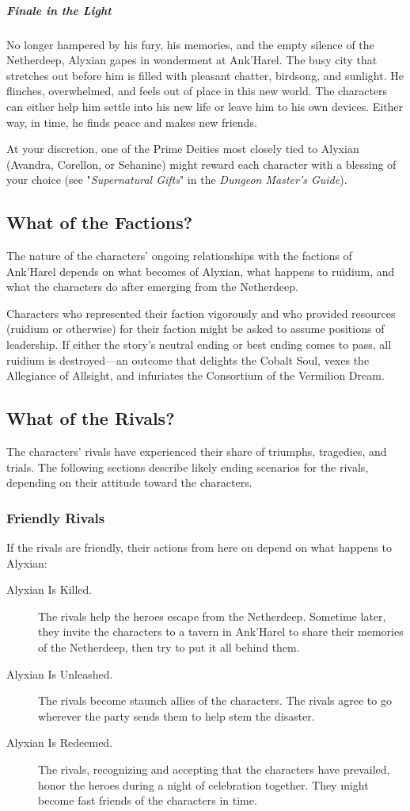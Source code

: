 \documentclass[10pt,a4paper,twoside,bg=print,twocolumn,openany,nodeprecatedcode]{dndbook}
\begin{document}
\subparagraph{Finale in the Light}
No longer hampered by his fury, his memories, and the empty silence of the Netherdeep, Alyxian gapes in wonderment at Ank'Harel. The busy city that stretches out before him is filled with pleasant chatter, birdsong, and sunlight. He flinches, overwhelmed, and feels out of place in this new world. The characters can either help him settle into his new life or leave him to his own devices. Either way, in time, he finds peace and makes new friends.

At your discretion, one of the Prime Deities most closely tied to Alyxian (Avandra, Corellon, or Sehanine) might reward each character with a blessing of your choice (see "\textit{Supernatural Gifts}" in the \textit{Dungeon Master's Guide}).

\subsection{What of the Factions?}
The nature of the characters' ongoing relationships with the factions of Ank'Harel depends on what becomes of Alyxian, what happens to ruidium, and what the characters do after emerging from the Netherdeep.

Characters who represented their faction vigorously and who provided resources (ruidium or otherwise) for their faction might be asked to assume positions of leadership. If either the story's neutral ending or best ending comes to pass, all ruidium is destroyed—an outcome that delights the Cobalt Soul, vexes the Allegiance of Allsight, and infuriates the Consortium of the Vermilion Dream.

\subsection{What of the Rivals?}
The characters' rivals have experienced their share of triumphs, tragedies, and trials. The following sections describe likely ending scenarios for the rivals, depending on their attitude toward the characters.

\subsubsection{Friendly Rivals}
If the rivals are friendly, their actions from here on depend on what happens to Alyxian:


\begin{description}
\item[Alyxian Is Killed.]
The rivals help the heroes escape from the Netherdeep. Sometime later, they invite the characters to a tavern in Ank'Harel to share their memories of the Netherdeep, then try to put it all behind them.
\item[Alyxian Is Unleashed.]
The rivals become staunch allies of the characters. The rivals agree to go wherever the party sends them to help stem the disaster.
\item[Alyxian Is Redeemed.]
The rivals, recognizing and accepting that the characters have prevailed, honor the heroes during a night of celebration together. They might become fast friends of the characters in time.
\end{description}
\end{document}
